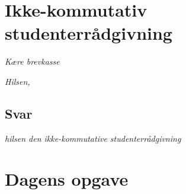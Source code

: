 \begin{minipage}[t]{170mm}
\vspace{3mm}
\section*{Ikke-kommutativ studenterrådgivning}
\emph{Kære brevkasse}


\emph{Hilsen, }

\subsection*{Svar}

{\flushright\emph{hilsen den ikke-kommutative studenterrådgivning}}
\vspace{3mm}
\section*{Dagens opgave}



\end{minipage}
